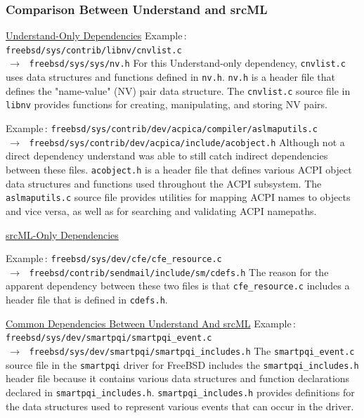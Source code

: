 \documentclass[12pt, dvipsnames, a4paper]{article}
\newcommand{\code}[1]{\texttt{#1}}
\begin{document}
\subsubsection{Comparison Between Understand and srcML}
\underline{Understand-Only Dependencies}
\newline
\newline
Example$\,\colon\,$\texttt{freebsd/sys/contrib/libnv/cnvlist.c \\$\,\to\,$ freebsd/sys/sys/nv.h}
\newline
\newline
For this Understand-only dependency, \code{cnvlist.c} uses data structures and functions defined in \code{nv.h}. \code{nv.h} is a header file that defines the "name-value" (NV) pair data structure. The \code{cnvlist.c} source file in \code{libnv} provides functions for creating, manipulating, and storing NV pairs.

Example$\,\colon\,$\texttt{freebsd/sys/contrib/dev/acpica/compiler/aslmaputils.c \\$\,\to\,$ freebsd/sys/contrib/dev/acpica/include/acobject.h}
\newline
\newline
Although not a direct dependency understand was able to still catch indirect dependencies between these files. \code{acobject.h} is a header file that defines various ACPI object data structures and functions used throughout the ACPI subsystem. The \code{aslmaputils.c} source file provides utilities for mapping ACPI names to objects and vice versa, as well as for searching and validating ACPI namepaths.

\underline{srcML-Only Dependencies}

Example$\,\colon\,$\texttt{freebsd/sys/dev/cfe/cfe\_resource.c \\$\,\to\,$ freebsd/contrib/sendmail/include/sm/cdefs.h}
\newline
\newline
The reason for the apparent dependency between these two files is that \code{cfe\_resource.c} includes a header file that is defined in \code{cdefs.h}.


\underline{Common Dependencies Between Understand And srcML}
\newline
\newline
Example$\,\colon\,$\texttt{freebsd/sys/dev/smartpqi/smartpqi\_event.c \\$\,\to\,$ freebsd/sys/dev/smartpqi/smartpqi\_includes.h}
\newline
\newline
The \code{smartpqi\_event.c} source file in the \code{smartpqi} driver for FreeBSD includes the \code{smartpqi\_includes.h} header file because it contains various data structures and function declarations declared in \code{smartpqi\_includes.h}. \code{smartpqi\_includes.h}  provides definitions for the data structures used to represent various events that can occur in the driver.
\end{document}
